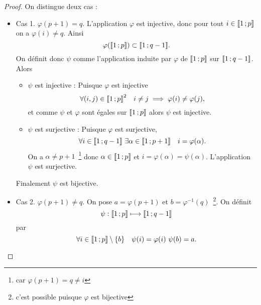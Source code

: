 \begin{proof}
On distingue deux cas :
\begin{itemize}
\item Cas 1. $\varphi(p+1)=q$. L'application $\varphi$ est injective, donc pour tout $i \in \mathopen{\llbracket}1\mathclose{}\mathpunct{};p\mathclose{\rrbracket}$ on a $\varphi(i) \neq q$. Ainsi
  \begin{equation}
    \varphi(\mathopen{\llbracket}1\mathclose{}\mathpunct{};p\mathclose{\rrbracket}) \subset \mathopen{\llbracket}1\mathclose{}\mathpunct{};q-1\mathclose{\rrbracket}.
  \end{equation}
  On définit donc $\psi$ comme l'application induite par $\varphi$ de $\mathopen{\llbracket}1\mathclose{}\mathpunct{};p\mathclose{\rrbracket}$ sur $\mathopen{\llbracket}1\mathclose{}\mathpunct{};q-1\mathclose{\rrbracket}$. Alors
  \begin{itemize}
  \item $\psi$ est injective : Puisque $\varphi$ est injective
    \begin{equation}
      \forall (i, j) \in \mathopen{\llbracket}1\mathclose{}\mathpunct{};p\mathclose{\rrbracket}^2 \quad i \neq j \implies \varphi(i) \neq \varphi(j),
    \end{equation}
    et comme $\psi$ et $\varphi$ sont égales sur $\mathopen{\llbracket}1\mathclose{}\mathpunct{};p\mathclose{\rrbracket}$ alors $\psi$ est injective.
  \item $\psi$ est surjective : Puisque $\varphi$ est surjective,
    \begin{equation}
      \forall i \in \mathopen{\llbracket}1\mathclose{}\mathpunct{};q-1\mathclose{\rrbracket} \ \exists \alpha \in \mathopen{\llbracket}1\mathclose{}\mathpunct{};p+1\mathclose{\rrbracket} \quad i=\varphi(\alpha).
    \end{equation}
    On a $\alpha \neq p+1$~\footnote{car $\varphi(p+1)=q \neq i$} donc $\alpha \in \mathopen{\llbracket}1\mathclose{}\mathpunct{};p\mathclose{\rrbracket}$ et $i= \varphi(\alpha)=\psi(\alpha)$. L'application $\psi$ est surjective.
  \end{itemize}
  Finalement $\psi$ est bijective.
\item Cas 2. $\varphi(p+1) \neq q$. On pose $a=\varphi(p+1)$ et $b=\varphi^{-1}(q)$~\footnote{c'est possible puisque $\varphi$ est bijective}. On définit
  \begin{equation}
    \psi :\mathopen{\llbracket}1\mathclose{}\mathpunct{};p\mathclose{\rrbracket} \longmapsto \mathopen{\llbracket}1\mathclose{}\mathpunct{};q-1\mathclose{\rrbracket}
  \end{equation}
  par
  \begin{equation}
    \forall i \in \mathopen{\llbracket}1\mathclose{}\mathpunct{};p\mathclose{\rrbracket} \setminus \{b\} \quad \psi(i)=\varphi(i) \ \psi(b)=a.
  \end{equation}
  

\end{itemize}
\end{proof}
